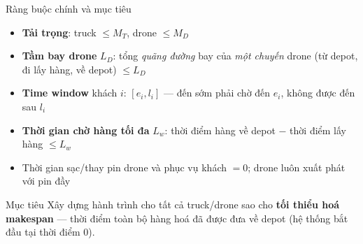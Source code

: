 \documentclass[aspectratio=169]{beamer}
\newcommand{\hl}[1]{\textcolor{blue!60!black}{\textbf{#1}}}
\begin{document}
\begin{frame}{Ràng buộc chính và mục tiêu}
  \begin{itemize}
    \item \hl{Tải trọng}: truck $\le M_T$, drone $\le M_D$
    \item \hl{Tầm bay drone} $L_D$: tổng \emph{quãng đường} bay của \emph{một chuyến} drone (từ depot, đi lấy hàng, về depot) $\le L_D$
    \item \hl{Time window} khách $i$: $[e_i, l_i]$ — đến sớm phải chờ đến $e_i$, không được đến sau $l_i$
    \item \hl{Thời gian chờ hàng tối đa} $L_w$: thời điểm hàng về depot $-$ thời điểm lấy hàng $\le L_w$
    \item Thời gian sạc/thay pin drone và phục vụ khách $= 0$; drone luôn xuất phát với pin đầy
  \end{itemize}
  \vspace{2mm}
  \begin{block}{Mục tiêu}
    Xây dựng hành trình cho tất cả truck/drone sao cho \hl{tối thiểu hoá makespan} — thời điểm toàn bộ hàng hoá đã được đưa về depot (hệ thống bắt đầu tại thời điểm 0).
  \end{block}
\end{frame}
\end{document}
